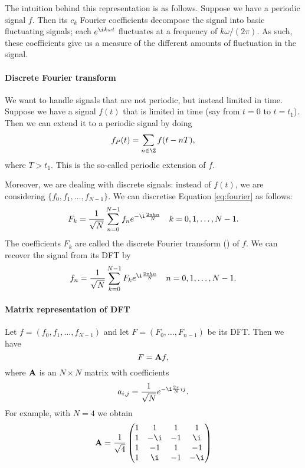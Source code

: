 \documentclass[a4paper, 11pt, openany]{book}
\begin{document}
The intuition behind this representation is as follows. Suppose we have a periodic signal $f$. Then its $c_k$ Fourier coefficients decompose the signal into basic fluctuating signals; each $e^{\i k \omega t}$ fluctuates at a frequency of $k \omega/(2 \pi)$. As such, these coefficients give us a measure of the different amounts of fluctuation in the signal.

\paragraph{Discrete Fourier transform}
We want to handle signals that are not periodic, but instead limited in time. Suppose we have a signal $f(t)$ that is limited in time (say from $t=0$ to $t = t_1$). Then we can extend it to a periodic signal by doing
\[
    f_P(t) = \sum_{n \in \Z} f(t - nT),
\]
where $T > t_1$. This is the so-called periodic extension of $f$.

Moreover, we are dealing with discrete signals: instead of $f(t)$, we are considering $\{f_0, f_1, \dots, f_{N-1} \}$. We can discretise Equation \eqref{eq:fourier} as follows:
\[
    F_k = \frac{1}{\sqrt{N}} \sum_{n=0}^{N-1}  f_n e^{-\i \frac{2 \pi k n }{N}} \quad k = 0, 1, \dots, N-1.
\]
The coefficients $F_k$ are called the discrete Fourier transform () of $f$. We can recover the signal from its DFT by
\[
    f_n = \frac{1}{\sqrt{N}} \sum_{k=0}^{N-1} F_k e^{\i \frac{2 \pi k n }{N}} \quad n = 0, 1, \dots, N-1.
\]

\paragraph{Matrix representation of DFT}
Let $f = (f_0, f_1, \dots, f_{N-1})$ and let $F = (F_0, \dots, F_{n-1})$ be its DFT. Then we have
\[
    F = {\bf A} f,
\]
where ${\bf A}$ is an $N \times N$ matrix with coefficients
\[
    a_{i,j} = \frac{1}{\sqrt{N}} e^{- \i \frac{2\pi}{N} ij}.
\]
For example, with $N = 4$ we obtain
\[
    {\bf A} = \frac{1}{\sqrt{4}} \begin{pmatrix}
    1 & 1 & 1 & 1\\
    1 & -\i & -1 & \i\\
    1 & -1 & 1 & -1\\
    1 & \i & -1 & -\i
    \end{pmatrix}
\]
\end{document}
